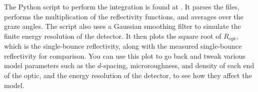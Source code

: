 The Python script to perform the integration is found at
. It parses the  files, performs the
multiplication of the reflectivity functions, and averages over the graze
angles. The script also uses a Gaussian smoothing filter to simulate the finite
energy resolution of the detector. It then plots the square root of
$R_\text{opt}$, which is the single-bounce reflectivity, along with the measured
single-bounce reflectivity for comparison. You can use this plot to go back and
tweak various model parameters such as the $d$-spacing, microroughness, and
density of each end of the optic, and the energy resolution of the detector, to
see how they affect the model.


